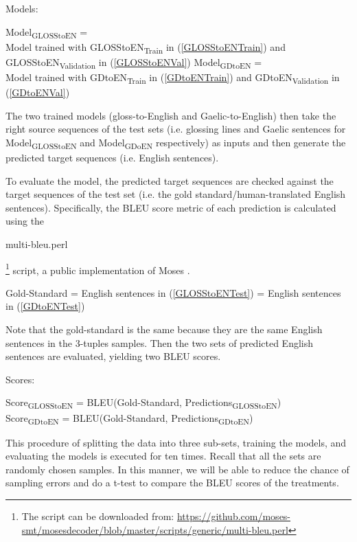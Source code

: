 \documentclass[11pt,a4paper]{article}
\begin{document}
\begin{exe}
\ex Models:
	\begin{xlist}
	\ex \label{ModelGlossToEN} Model\textsubscript{GLOSStoEN} =\\ Model trained with GLOSStoEN\textsubscript{Train} in (\ref{GLOSStoENTrain}) and GLOSStoEN\textsubscript{Validation} in (\ref{GLOSStoENVal})
	\ex \label{ModelGDToEN}Model\textsubscript{GDtoEN} =\\ Model trained with GDtoEN\textsubscript{Train} in (\ref{GDtoENTrain}) and GDtoEN\textsubscript{Validation} in (\ref{GDtoENVal})
	\end{xlist}	
\end{exe}
The two trained models (gloss-to-English and Gaelic-to-English) then take the right source sequences of the test sets (i.e. glossing lines and Gaelic sentences for Model\textsubscript{GLOSStoEN} and Model\textsubscript{GDoEN} respectively) as inputs and then generate the predicted target sequences (i.e. English sentences).

To evaluate the model, the predicted target sequences are checked against the target sequences of the test set (i.e. the gold standard/human-translated English sentences).
Specifically, the BLEU score metric \citep{bleu} of each prediction is calculated using the \begin{myfont} multi-bleu.perl\end{myfont}\footnote{The script can be downloaded from: \url{https://github.com/moses-smt/mosesdecoder/blob/master/scripts/generic/multi-bleu.perl}}
script, a public implementation of Moses \citep{moses}. 
\begin{exe}
\ex Gold-Standard = English sentences in (\ref{GLOSStoENTest}) = English sentences in (\ref{GDtoENTest})
\end{exe}
Note that the gold-standard is the same because they are the same English sentences in the 3-tuples samples. Then the two sets of predicted English sentences are evaluated, yielding two BLEU scores.  

\begin{exe}
\ex Scores: \\
 \begin{xlist}
	\ex Score\textsubscript{GLOSStoEN} = BLEU(Gold-Standard, Predictions\textsubscript{GLOSStoEN}) \\
	\ex Score\textsubscript{GDtoEN} = BLEU(Gold-Standard, Predictions\textsubscript{GDtoEN}) \\
 \end{xlist}
\end{exe}
This procedure of splitting the data into three sub-sets, training the models, and evaluating the models is executed for ten times. Recall that all the sets are randomly chosen samples. In this manner, we will be able to reduce the chance of sampling errors and do a t-test to compare the BLEU scores of the treatments.  
\end{document}
